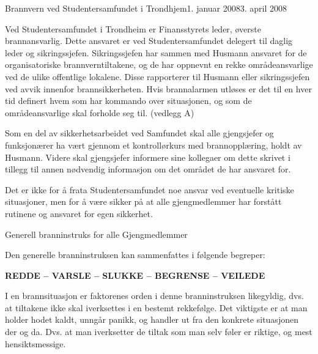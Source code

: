 
\begin{instruks}{Brannvern ved Studentersamfundet i Trondhjem}{1. januar 2008}{3. april 2008}
    
Ved Studentersamfundet i Trondheim er Finansstyrets leder, øverste brannansvarlig. Dette ansvaret er ved
Studentersamfundet delegert til daglig leder og sikringssjefen. Sikringssjefen har sammen med Husmann ansvaret for
de organisatoriske brannverntiltakene, og de har oppnevnt en rekke områdeansvarlige ved de ulike offentlige lokalene.
Disse rapporterer til Husmann eller sikringssjefen ved avvik innenfor brannsikkerheten.
Hvis brannalarmen utløses er det til en hver tid definert hvem som har kommando over situasjonen, og som de
områdeansvarlige skal forholde seg til. (vedlegg A) 

Som en del av sikkerhetsarbeidet ved Samfundet skal alle gjengsjefer og funksjonærer ha vært gjennom et
kontrollørkurs med brannopplæring, holdt av Husmann. Videre skal gjengsjefer informere sine kollegaer om dette skrivet 
i tillegg til annen nødvendig informasjon om det området de har ansvaret for. 

Det er ikke for å frata Studentersamfundet noe ansvar ved eventuelle kritiske situasjoner, men for å være sikker på at
alle gjengmedlemmer har forstått rutinene og ansvaret for egen sikkerhet.

\begin{instruksledd}{Generell branninstruks for alle Gjengmedlemmer}
   
    Den generelle branninstruksen kan sammenfattes i følgende begreper:
    
    \begin{center}
        \textbf{REDDE -- VARSLE -- SLUKKE -- BEGRENSE -- VEILEDE}
    \end{center}
    
    I en brannsituasjon er faktorenes orden i denne branninstruksen likegyldig, dvs. at
    tiltakene ikke skal iverksettes i en
    bestemt rekkefølge. Det viktigste er at man holder hodet kaldt, unngår panikk, og
    handler ut fra den konkrete
    situasjonen der og da. Dvs. at man iverksetter de tiltak som man selv føler er
    riktige, og mest hensiktsmessige.


\end{instruksledd}
\end{instruks}
